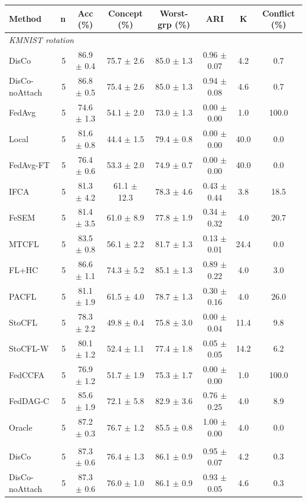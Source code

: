 {\scriptsize
\begin{tabular}{l r c c c c c c}
\toprule
Method & n & Acc (\%) & Concept (\%) & Worst-grp (\%) & ARI & K & Conflict (\%) \\
\midrule
\multicolumn{8}{l}{\textit{KMNIST rotation}} \\
DisCo & 5 & 86.9 $\pm$ 0.4 & 75.7 $\pm$ 2.6 & 85.0 $\pm$ 1.3 & 0.96 $\pm$ 0.07 & 4.2 & 0.7 \\
DisCo-noAttach & 5 & 86.8 $\pm$ 0.5 & 75.4 $\pm$ 2.6 & 85.0 $\pm$ 1.3 & 0.94 $\pm$ 0.08 & 4.6 & 0.7 \\
FedAvg & 5 & 74.6 $\pm$ 1.3 & 54.1 $\pm$ 2.0 & 73.0 $\pm$ 1.3 & 0.00 $\pm$ 0.00 & 1.0 & 100.0 \\
Local & 5 & 81.6 $\pm$ 0.8 & 44.4 $\pm$ 1.5 & 79.4 $\pm$ 0.8 & 0.00 $\pm$ 0.00 & 40.0 & 0.0 \\
FedAvg-FT & 5 & 76.4 $\pm$ 0.6 & 53.3 $\pm$ 2.0 & 74.9 $\pm$ 0.7 & 0.00 $\pm$ 0.00 & 40.0 & 0.0 \\
IFCA & 5 & 81.3 $\pm$ 4.2 & 61.1 $\pm$ 12.3 & 78.3 $\pm$ 4.6 & 0.43 $\pm$ 0.44 & 3.8 & 18.5 \\
FeSEM & 5 & 81.4 $\pm$ 3.5 & 61.0 $\pm$ 8.9 & 77.8 $\pm$ 1.9 & 0.34 $\pm$ 0.32 & 4.0 & 20.7 \\
MTCFL & 5 & 83.5 $\pm$ 0.8 & 56.1 $\pm$ 2.2 & 81.7 $\pm$ 1.3 & 0.13 $\pm$ 0.01 & 24.4 & 0.0 \\
FL+HC & 5 & 86.6 $\pm$ 1.1 & 74.3 $\pm$ 5.2 & 85.1 $\pm$ 1.3 & 0.89 $\pm$ 0.22 & 4.0 & 3.0 \\
PACFL & 5 & 81.1 $\pm$ 1.9 & 61.5 $\pm$ 4.0 & 78.7 $\pm$ 1.3 & 0.30 $\pm$ 0.16 & 4.0 & 26.0 \\
StoCFL & 5 & 78.3 $\pm$ 2.2 & 49.8 $\pm$ 0.4 & 75.8 $\pm$ 3.0 & 0.00 $\pm$ 0.04 & 11.4 & 9.8 \\
StoCFL-W & 5 & 80.1 $\pm$ 1.2 & 52.4 $\pm$ 1.1 & 77.4 $\pm$ 1.8 & 0.05 $\pm$ 0.05 & 14.2 & 6.2 \\
FedCCFA & 5 & 76.9 $\pm$ 1.2 & 51.7 $\pm$ 1.9 & 75.3 $\pm$ 1.7 & 0.00 $\pm$ 0.00 & 1.0 & 100.0 \\
FedDAG-C & 5 & 85.6 $\pm$ 1.9 & 72.1 $\pm$ 5.8 & 82.9 $\pm$ 3.6 & 0.76 $\pm$ 0.25 & 4.0 & 8.9 \\
Oracle & 5 & 87.2 $\pm$ 0.3 & 76.7 $\pm$ 1.2 & 85.5 $\pm$ 0.8 & 1.00 $\pm$ 0.00 & 4.0 & 0.0 \\
\addlinespace
\multicolumn{8}{l}{\textit{KMNIST label swap}} \\
DisCo & 5 & 87.3 $\pm$ 0.6 & 76.4 $\pm$ 1.3 & 86.1 $\pm$ 0.9 & 0.95 $\pm$ 0.07 & 4.2 & 0.3 \\
DisCo-noAttach & 5 & 87.3 $\pm$ 0.6 & 76.0 $\pm$ 1.0 & 86.1 $\pm$ 0.9 & 0.93 $\pm$ 0.05 & 4.6 & 0.3 \\

\end{tabular}}
